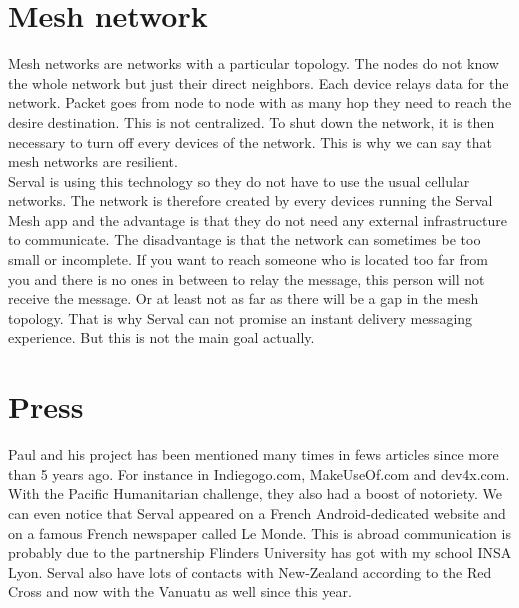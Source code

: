 \section{Mesh network}
Mesh networks are networks with a particular topology. The nodes do not know the whole network but just their direct neighbors. Each device relays data for the network. Packet goes from node to node with as many hop they need to reach the desire destination. This is not centralized. To shut down the network, it is then necessary to turn off every devices of the network. This is why we can say that mesh networks are resilient. \\
Serval is using this technology so they do not have to use the usual cellular networks. The network is therefore created by every devices running the Serval Mesh app and the advantage is that they do not need any external infrastructure to communicate. The disadvantage is that the network can sometimes be too small or incomplete. If you want to reach someone who is located too far from you and there is no ones in between to relay the message, this person will not receive the message. Or at least not as far as there will be a gap in the mesh topology. That is why Serval can not promise an instant delivery messaging experience. But this is not the main goal actually.

\section{Press}
Paul and his project has been mentioned many times in fews articles since more than 5 years ago. For instance in Indiegogo.com, MakeUseOf.com and dev4x.com. With the Pacific Humanitarian challenge, they also had a boost of notoriety. We can even notice that Serval appeared on a French Android-dedicated website and on a famous French newspaper called Le Monde. This is abroad communication is probably due to the partnership Flinders University has got with my school INSA Lyon. Serval also have lots of contacts with New-Zealand according to the Red Cross and now with the Vanuatu as well since this year. 

